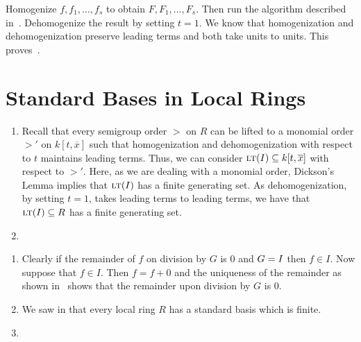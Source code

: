 \documentclass[letterpaper, 11pt, oneside]{book}
\begin{document}
\begin{sol}\label{ex:UAG_4.3.13}
\end{sol}

\begin{sol}\label{ex:UAG_4.3.14}
  Homogenize $f, f_{1}, \ldots, f_{s}$ to obtain $F, F_{1}, \ldots, F_{s}$.
  Then run the algorithm described in~\cite[\S 4.2, Theorem 3.10]{book:UAG}.
  Dehomogenize the result by setting $t = 1$.
  We know that homogenization and dehomogenization preserve leading terms and both take units to units.
  This proves~\cite[\S 4.2, Corollary 3.13]{book:UAG}.
\end{sol}

\clearpage

\section{Standard Bases in Local Rings}

\begin{sol}\label{ex:UAG_4.4.1}
  \begin{enumerate}
    \item Recall that every semigroup order $>$ on $R$ can be lifted to a monomial order $>'$ on $k[t, \overline{x}]$ such that homogenization and dehomogenization with respect to $t$ maintains leading terms.
          Thus, we can consider $\ideal{\lt(I)} \subseteq k[t, \overline{x}]$ with respect to $>'$.
          Here, as we are dealing with a monomial order, Dickson's Lemma implies that $\ideal{\lt(I)}$ has a finite generating set.
          As dehomogenization, by setting $t = 1$, takes leading terms to leading terms, we have that $\ideal{\lt(I)} \subseteq R$ has a finite generating set.
    \item {}
  \end{enumerate}
\end{sol}

\begin{sol}\label{ex:UAG_4.4.2}
  \begin{enumerate}
    \item Clearly if the remainder of $f$ on division by $G$ is $0$ and $\ideal{G} = I$ then $f \in I$.
          Now suppose that $f \in I$.
          Then $f = f + 0$ and the uniqueness of the remainder as shown in~\cite[\S 4.4, Theorem 4.3]{book:UAG} shows that the remainder upon division by $G$ is $0$.
    \item We saw in  that every local ring $R$ has a standard basis which is finite.
    \item {}
  \end{enumerate}
\end{sol}
\end{document}
